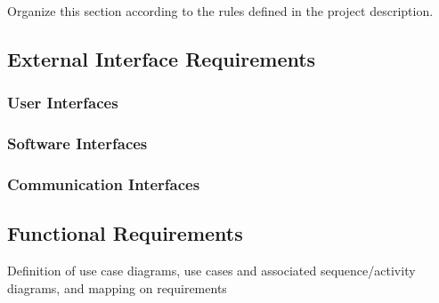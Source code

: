 Organize this section according to the rules defined in the project description. 
\subsection{External Interface Requirements}
\subsubsection{User Interfaces}
\subsubsection{Software Interfaces}
\subsubsection{Communication Interfaces}
\subsection{Functional Requirements}
Definition of use case diagrams, use cases and associated sequence/activity diagrams, and mapping on requirements

\setcounter{usecase_counter}{1}

%
%
%




%
% 


%

